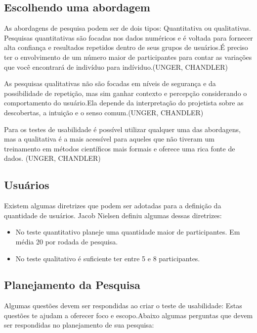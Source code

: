 \subsection{Escolhendo uma abordagem}

As abordagens de pesquisa podem ser de dois tipos: Quantitativa ou qualitativas. 
Pesquisas quantitativas são focadas nos dados numéricos e é voltada para fornecer alta confiança e resultados repetidos dentro de seus grupos de usuários.É preciso ter o envolvimento de um número maior de participantes para contar as variações que você encontrará de indivíduo para indíviduo.(UNGER, CHANDLER)

As pesquisas qualitativas não são focadas em níveis de segurança e da possibilidade de repetição, mas sim ganhar contexto e percepção considerando o comportamento do usuário.Ela depende da interpretação do projetista sobre as descobertas, a intuição e o senso comum.(UNGER, CHANDLER)

Para os testes de usabilidade é possível utilizar qualquer uma das abordagens, mas a qualitativa é a mais acessível para aqueles que não tiveram um treinamento em métodos científicos mais formais e oferece uma rica fonte de dados. (UNGER, CHANDLER)


\subsection {Usuários}

Existem algumas diretrizes que podem ser adotadas para a definição da quantidade de usuários. Jacob Nielsen definiu algumas dessas diretrizes:

\begin{itemize}
\item No teste quantitativo planeje uma quantidade maior de participantes. Em média 20 por rodada de pesquisa.
\item No teste qualitativo é suficiente ter entre 5 e 8 participantes.
\end{itemize}

\subsection {Planejamento da Pesquisa}

Algumas questões devem ser respondidas ao criar o teste de usabilidade: Estas questões te ajudam a oferecer foco e escopo.Abaixo algumas perguntas que devem ser respondidas no planejamento de sua pesquisa:

